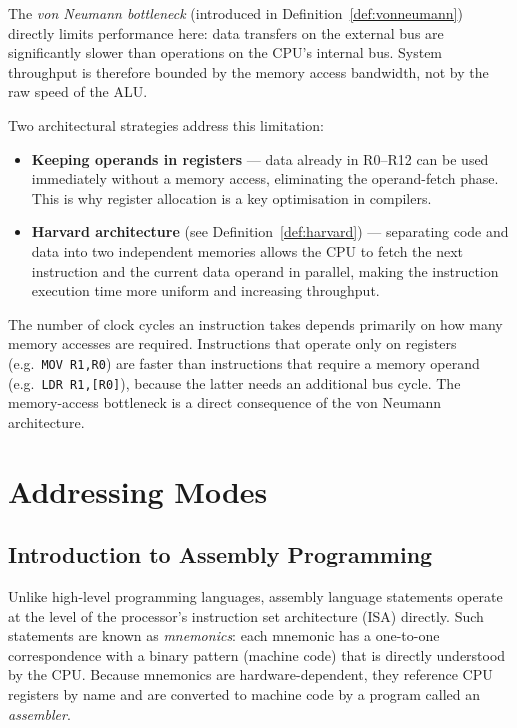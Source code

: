 \documentclass[11pt, a4paper, notitlepage]{report}
\theoremstyle{definition}
\theoremstyle{remark}
\theoremstyle{definition}
\begin{document}
The \emph{von Neumann bottleneck} (introduced in Definition~\ref{def:vonneumann}) directly limits performance here: data transfers on the external bus are significantly slower than operations on the CPU's internal bus. System throughput is therefore bounded by the memory access bandwidth, not by the raw speed of the ALU\@.

Two architectural strategies address this limitation:

\begin{itemize}
  \item \textbf{Keeping operands in registers} --- data already in R0--R12 can be used immediately without a memory access, eliminating the operand-fetch phase. This is why register allocation is a key optimisation in compilers.
  \item \textbf{Harvard architecture} (see Definition~\ref{def:harvard}) --- separating code and data into two independent memories allows the CPU to fetch the next instruction and the current data operand in parallel, making the instruction execution time more uniform and increasing throughput.
\end{itemize}

\begin{keyresult}[title={Execution Speed Factors}]
The number of clock cycles an instruction takes depends primarily on how many memory accesses are required. Instructions that operate only on registers (e.g.\ \texttt{MOV R1,R0}) are faster than instructions that require a memory operand (e.g.\ \texttt{LDR R1,[R0]}), because the latter needs an additional bus cycle. The memory-access bottleneck is a direct consequence of the von Neumann architecture.
\end{keyresult}

\chapter{Addressing Modes}

\section{Introduction to Assembly Programming}

Unlike high-level programming languages, assembly language statements operate at the level of the processor's instruction set architecture (ISA) directly. Such statements are known as \emph{mnemonics}: each mnemonic has a one-to-one correspondence with a binary pattern (machine code) that is directly understood by the CPU\@. Because mnemonics are hardware-dependent, they reference CPU registers by name and are converted to machine code by a program called an \emph{assembler}.
\end{document}
